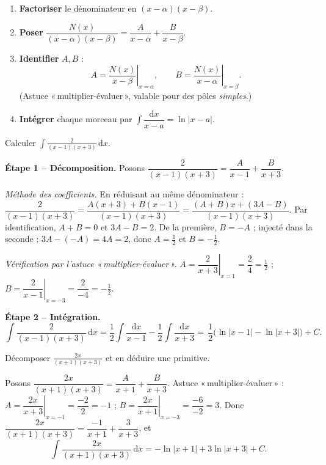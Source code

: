 \documentclass[11pt,a4paper]{article}
\newcommand{\dd}{\mathrm{d}}
\begin{document}
\begin{methode}
\begin{enumerate}[leftmargin=1.8em,topsep=2pt,itemsep=2pt]
  \item \textbf{Factoriser} le dénominateur en $(x-\alpha)(x-\beta)$.
  \item \textbf{Poser} $\dfrac{N(x)}{(x-\alpha)(x-\beta)}=\dfrac{A}{x-\alpha}+\dfrac{B}{x-\beta}$.
  \item \textbf{Identifier} $A,B$ :
        \[
          A=\left.\frac{N(x)}{x-\beta}\right|_{x=\alpha},\qquad
          B=\left.\frac{N(x)}{x-\alpha}\right|_{x=\beta}.
        \]
        (Astuce «\,multiplier-évaluer\,», valable pour des pôles \emph{simples}.)
  \item \textbf{Intégrer} chaque morceau par $\int\dfrac{\dd x}{x-a}=\ln|x-a|$.
\end{enumerate}
\end{methode}

\begin{exemple}
Calculer $\displaystyle\int \frac{2}{(x-1)(x+3)}\,\dd x$.

\smallskip
\textbf{Étape 1 -- Décomposition.} Posons
$\dfrac{2}{(x-1)(x+3)}=\dfrac{A}{x-1}+\dfrac{B}{x+3}$.

\textit{Méthode des coefficients.} En réduisant au même dénominateur :
$\dfrac{2}{(x-1)(x+3)}=\dfrac{A(x+3)+B(x-1)}{(x-1)(x+3)}
=\dfrac{(A+B)x+(3A-B)}{(x-1)(x+3)}$.
Par identification, $A+B=0$ et $3A-B=2$. De la première, $B=-A$ ; injecté dans la seconde :
$3A-(-A)=4A=2$, donc $A=\tfrac12$ et $B=-\tfrac12$.

\textit{Vérification par l'astuce «\,multiplier-évaluer\,».}
$A=\left.\dfrac{2}{x+3}\right|_{x=1}=\dfrac{2}{4}=\tfrac12$ ;
$B=\left.\dfrac{2}{x-1}\right|_{x=-3}=\dfrac{2}{-4}=-\tfrac12$. \checkmark

\textbf{Étape 2 -- Intégration.}
\[
\int\frac{2}{(x-1)(x+3)}\,\dd x
=\frac12\int\frac{\dd x}{x-1}-\frac12\int\frac{\dd x}{x+3}
=\boxed{\,\frac12\bigl(\ln|x-1|-\ln|x+3|\bigr)+C.\,}
\]
\end{exemple}

\begin{exemple}
Décomposer $\displaystyle\frac{2x}{(x+1)(x+3)}$ et en déduire une primitive.

\smallskip
Posons $\dfrac{2x}{(x+1)(x+3)}=\dfrac{A}{x+1}+\dfrac{B}{x+3}$.
Astuce «\,multiplier-évaluer\,» :
$A=\left.\dfrac{2x}{x+3}\right|_{x=-1}=\dfrac{-2}{2}=-1$ ;
$B=\left.\dfrac{2x}{x+1}\right|_{x=-3}=\dfrac{-6}{-2}=3$.
Donc $\dfrac{2x}{(x+1)(x+3)}=\dfrac{-1}{x+1}+\dfrac{3}{x+3}$, et
\[
\int\frac{2x}{(x+1)(x+3)}\,\dd x=-\ln|x+1|+3\ln|x+3|+C.
\]
\end{exemple}
\end{document}
